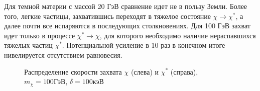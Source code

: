 Для темной материи с массой 20 ГэВ сравнение идет не в пользу Земли. Более того, легкие частицы, захватившись переходят в тяжелое состояние $\chi \rightarrow \chi^*$, а далее почти все испаряются в последующих столкновениях. Для 100 ГэВ захват идет только в процессе  $\chi^* \rightarrow \chi$, для которого необходимо наличие нераспавшихся тяжелых частиц $\chi^*$. Потенциальной усиление в 10 раз в конечном итоге нивелируется отсутствием равновесия.


\begin{figure}[!h]
\caption{ Распределение скорости захвата $\chi$ (слева) и $\chi^*$ (справа), $m_{\chi} = 100 ГэВ$, $\delta = 100 кэВ$}
\label{plot:C_L_100_100}
\end{figure}

